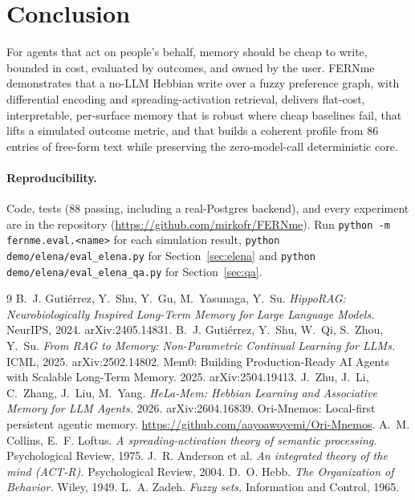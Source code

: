 \documentclass[11pt]{article}
\begin{document}
\section{Conclusion}
For agents that act on people's behalf, memory should be cheap to write, bounded in cost,
evaluated by outcomes, and owned by the user. FERNme demonstrates that a no-LLM Hebbian
write over a fuzzy preference graph, with differential encoding and spreading-activation
retrieval, delivers flat-cost, interpretable, per-surface memory that is robust where cheap
baselines fail, that lifts a simulated outcome metric, and that builds a coherent profile
from 86 entries of free-form text while preserving the zero-model-call deterministic core.

\paragraph{Reproducibility.} Code, tests (88 passing, including a real-Postgres backend),
and every experiment are in the repository (\url{https://github.com/mirkofr/FERNme}). Run
\texttt{python -m fernme.eval.<name>} for each simulation result, \texttt{python demo/elena/eval\_elena.py}
for Section~\ref{sec:elena} and \texttt{python demo/elena/eval\_elena\_qa.py} for Section~\ref{sec:qa}.

\begin{thebibliography}{9}
 B.~J. Guti\'errez, Y.~Shu, Y.~Gu, M.~Yasunaga, Y.~Su.
\emph{HippoRAG: Neurobiologically Inspired Long-Term Memory for Large Language Models.}
NeurIPS, 2024. arXiv:2405.14831.
 B.~J. Guti\'errez, Y.~Shu, W.~Qi, S.~Zhou, Y.~Su.
\emph{From RAG to Memory: Non-Parametric Continual Learning for LLMs.} ICML, 2025.
arXiv:2502.14802.
 Mem0: Building Production-Ready AI Agents with Scalable Long-Term Memory.
2025. arXiv:2504.19413.
 J.~Zhu, J.~Li, C.~Zhang, J.~Liu, M.~Yang.
\emph{HeLa-Mem: Hebbian Learning and Associative Memory for LLM Agents.} 2026.
arXiv:2604.16839.
 Ori-Mnemos: Local-first persistent agentic memory.
\url{https://github.com/aayoawoyemi/Ori-Mnemos}.
 A.~M. Collins, E.~F. Loftus.
\emph{A spreading-activation theory of semantic processing.} Psychological Review, 1975.
 J.~R. Anderson et al.
\emph{An integrated theory of the mind (ACT-R).} Psychological Review, 2004.
 D.~O. Hebb. \emph{The Organization of Behavior.} Wiley, 1949.
 L.~A. Zadeh. \emph{Fuzzy sets.} Information and Control, 1965.
\end{thebibliography}
\end{document}
